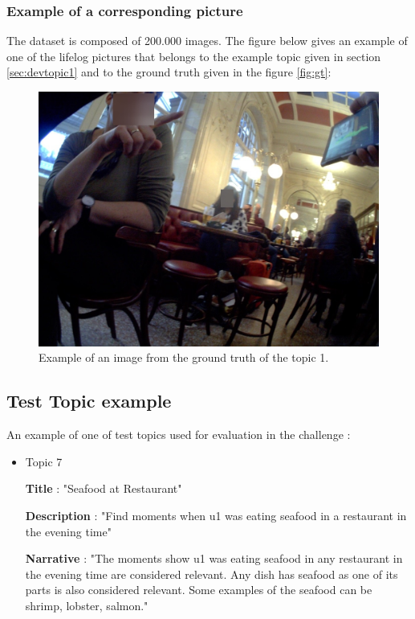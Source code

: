     \subsubsection{Example of a corresponding picture}

    The dataset is composed of 200.000 images. The figure below gives an example of one of the lifelog pictures that belongs to the example topic given in section \ref{sec:devtopic1} and to the ground truth given in the figure \ref{fig:gt}:

    \begin{figure}[htb]
        \centering
        \includegraphics[scale = 0.2]{Sections/5ImageClef/images/example.png}
        \caption{Example of an image from the ground truth of the topic 1.}
    \end{figure}
    

    \newpage


    \subsection{Test Topic example}

    An example of one of test topics used for evaluation in the challenge :

        \begin{itemize}

        \item Topic 7
        

        \textbf{Title} : "Seafood at Restaurant"

        \textbf{Description} : "Find moments when u1 was eating seafood in a restaurant in the evening time"

        \textbf{Narrative} : "The moments show u1 was eating seafood in any restaurant in the evening time are considered relevant. Any dish has seafood as one of its parts is also considered relevant. Some examples of the seafood can be shrimp, lobster, salmon."

        \end{itemize}
     
